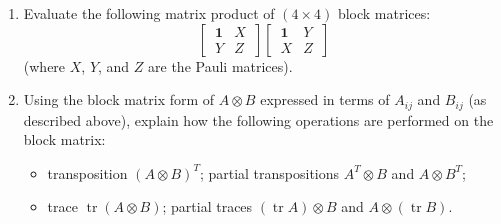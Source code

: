 \documentclass[fleqn]{article}
\providecommand{\tightlist}{%
  \setlength{\itemsep}{0pt}\setlength{\parskip}{0pt}}
\begin{document}
\begin{enumerate}
\def\labelenumi{\arabic{enumi}.}
\item
  Evaluate the following matrix product of \((4\times 4)\) block matrices:
  \[
     \left[
     \,
       \begin{array}{c|c}
         \mathbf{1}& X
       \\\hline
         Y & Z
       \end{array}
     \,
     \right]
     \left[
     \,
       \begin{array}{c|c}
         \mathbf{1}& Y
       \\\hline
         X & Z
       \end{array}
     \,
     \right]
   \]
  (where \(X\), \(Y\), and \(Z\) are the Pauli matrices).
\item
  Using the block matrix form of \(A\otimes B\) expressed in terms of \(A_{ij}\) and \(B_{ij}\) (as described above), explain how the following operations are performed on the block matrix:

  \begin{itemize}
  \tightlist
  \item
    transposition \((A\otimes B)^T\); partial transpositions \(A^T\otimes B\) and \(A\otimes B^T\);
  \item
    trace \(\operatorname{tr}(A\otimes B)\); partial traces \((\operatorname{tr}A )\otimes B\) and \(A\otimes (\operatorname{tr}B)\).
  \end{itemize}


\end{enumerate}
\end{document}
